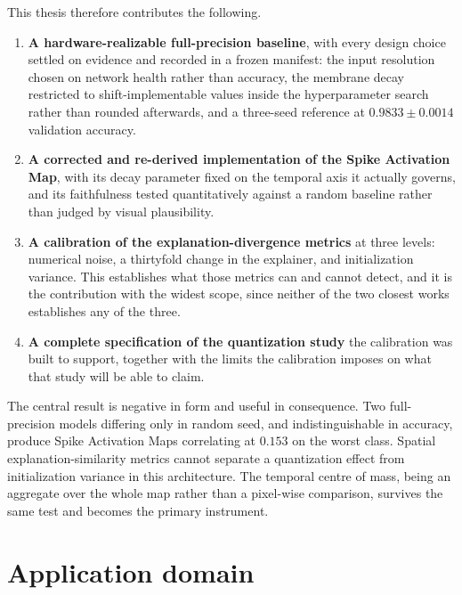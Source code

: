 This thesis therefore contributes the following.

\begin{enumerate}
  \item \textbf{A hardware-realizable full-precision baseline}, with every
        design choice settled on evidence and recorded in a frozen manifest: the
        input resolution chosen on network health rather than accuracy, the
        membrane decay restricted to shift-implementable values inside the
        hyperparameter search rather than rounded afterwards, and a three-seed
        reference at $0.9833 \pm 0.0014$ validation accuracy.

  \item \textbf{A corrected and re-derived implementation of the Spike
        Activation Map}, with its decay parameter fixed on the temporal axis it
        actually governs, and its faithfulness tested quantitatively against a
        random baseline rather than judged by visual plausibility.

  \item \textbf{A calibration of the explanation-divergence metrics} at three
        levels: numerical noise, a thirtyfold change in the explainer, and
        initialization variance. This establishes what those metrics can and
        cannot detect, and it is the contribution with the widest scope, since
        neither of the two closest works~\cite{rabbi2026, smith2026} establishes
        any of the three.

  \item \textbf{A complete specification of the quantization study} the
        calibration was built to support, together with the limits the
        calibration imposes on what that study will be able to claim.
\end{enumerate}

The central result is negative in form and useful in consequence. Two
full-precision models differing only in random seed, and indistinguishable in
accuracy, produce Spike Activation Maps correlating at $0.153$ on the worst
class. Spatial explanation-similarity metrics cannot separate a quantization
effect from initialization variance in this architecture. The temporal centre of
mass, being an aggregate over the whole map rather than a pixel-wise comparison,
survives the same test and becomes the primary instrument.

\section{Application domain}

